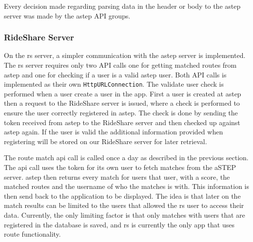 Every decision made regarding parsing data in the header or body to the \gls{astep} server was made by the \gls{astep} API groups.

\subsubsection{RideShare Server}
On the \gls{rs} server, a simpler communication with the \gls{astep} server is implemented.
The \gls{rs} server requires only two API calls one for getting matched routes from \gls{astep} and one for checking if a user is a valid \gls{astep} user.
Both API calls is implemented as their own \texttt{HttpURLConnection}.
The validate user check is performed when a user create a user in the app. 
First a user is created at \gls{astep} then a request to the RideShare server is issued, where a check is performed to ensure the user correctly registered in \gls{astep}.
The check is done by sending the token received from \gls{astep} to the RideShare server and then checked up against \gls{astep} again.
If the user is valid the additional information provided when registering will be stored on our RideShare server for later retrieval. 

The route match api call is called once a day as described in the previous section.
The api call uses the token for its own user to fetch matches from the aSTEP server. 
\gls{astep} then returns every match for users 
that user, with a score, the matched routes and the username of who the matches is with.
This information is then send back to the application to be displayed.
The idea is that later on the match results can be limited to the users that allowed the \gls{rs} user to access their data.
Currently, the only limiting factor is that only matches with users that are registered in the database is saved, and \gls{rs} is currently the only app that uses route functionality.
